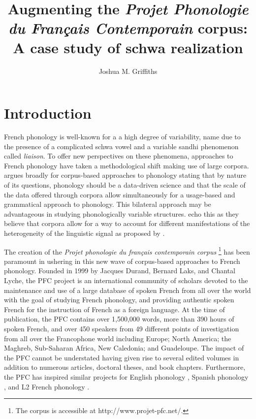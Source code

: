\documentclass[output=paper,colorlinks,citecolor=brown,
]{langscibook}
\author{Joshua M. Griffiths\affiliation{The University of Texas at Austin}\orcid{0000-0001-6320-7365}}
\title{Augmenting the \textit{Projet Phonologie du Fran\c{c}ais Contemporain} corpus: A case study of schwa realization}
\begin{document}
\maketitle

\section{Introduction}
French phonology is well-known for a a high degree of variability, name due to the presence of a complicated schwa vowel and a variable sandhi phenomenon called \textit{liaison}. To offer new perspectives on these phenomena, approaches to French phonology have taken a methodological shift making use of large corpora. \citet{laks} argues broadly for corpus-based approaches to phonology stating that by nature of its questions, phonology should be a data-driven science and that the scale of the data offered through corpora allow simultaneously for a usage-based and grammatical approach to phonology. This bilateral approach may be advantageous in studying phonologically variable structures. \citet{durand9} echo this as they believe that corpora allow for a way to account for different manifestations of the heterogeneity of the linguistic signal as proposed by \citet{weinreich}.

The creation of the \textit{Projet phonologie du fran\c{c}ais contemporain corpus} \citep[PFC;]{pfc,pfc2,pfc3}\footnote{The corpus is accessible at http://www.projet-pfc.net/.} has been paramount in ushering in this new wave of corpus-based approaches to French phonology. Founded in 1999 by Jacques Durand, Bernard Laks, and Chantal Lyche, the PFC project is an international community of scholars devoted to the maintenance and use of a large database of spoken French from all over the world with the goal of studying French phonology, and providing authentic spoken French for the instruction of French as a foreign language. At the time of publication, the PFC contains over 1,500,000 words, more than 390 hours of spoken French, and over 450 speakers from 49 different points of investigation from all over the Francophone world including Europe; North America; the Maghreb, Sub-Saharan Africa, New Caledonia; and Guadeloupe. The impact of the PFC cannot be understated having given rise to several edited volumes \citep[i.e.]{detey,durand13,gess} in addition to numerous articles, doctoral theses, and book chapters. Furthermore, the PFC has inspired similar projects for English phonology \citet{pac}, Spanish phonology \citet{fec}, and L2 French phonology \citet{ipfc}.
\end{document}
